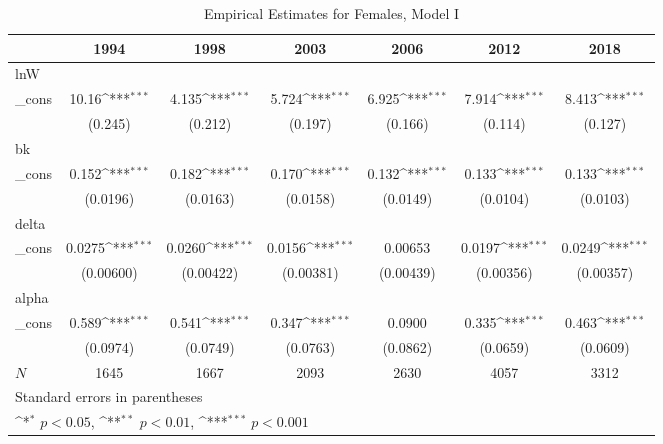 \begin{table}[htbp]\centering
\def\sym#1{\ifmmode^{#1}\else\(^{#1}\)\fi}
\caption{Empirical Estimates for Females, Model I}
\begin{tabular}{l*{6}{c}}
\hline\hline
            &\multicolumn{1}{c}{1994}&\multicolumn{1}{c}{1998}&\multicolumn{1}{c}{2003}&\multicolumn{1}{c}{2006}&\multicolumn{1}{c}{2012}&\multicolumn{1}{c}{2018}\\
\hline
lnW         &                     &                     &                     &                     &                     &                     \\
\_cons      &       10.16\sym{***}&       4.135\sym{***}&       5.724\sym{***}&       6.925\sym{***}&       7.914\sym{***}&       8.413\sym{***}\\
            &     (0.245)         &     (0.212)         &     (0.197)         &     (0.166)         &     (0.114)         &     (0.127)         \\
\hline
bk          &                     &                     &                     &                     &                     &                     \\
\_cons      &       0.152\sym{***}&       0.182\sym{***}&       0.170\sym{***}&       0.132\sym{***}&       0.133\sym{***}&       0.133\sym{***}\\
            &    (0.0196)         &    (0.0163)         &    (0.0158)         &    (0.0149)         &    (0.0104)         &    (0.0103)         \\
\hline
delta       &                     &                     &                     &                     &                     &                     \\
\_cons      &      0.0275\sym{***}&      0.0260\sym{***}&      0.0156\sym{***}&     0.00653         &      0.0197\sym{***}&      0.0249\sym{***}\\
            &   (0.00600)         &   (0.00422)         &   (0.00381)         &   (0.00439)         &   (0.00356)         &   (0.00357)         \\
\hline
alpha       &                     &                     &                     &                     &                     &                     \\
\_cons      &       0.589\sym{***}&       0.541\sym{***}&       0.347\sym{***}&      0.0900         &       0.335\sym{***}&       0.463\sym{***}\\
            &    (0.0974)         &    (0.0749)         &    (0.0763)         &    (0.0862)         &    (0.0659)         &    (0.0609)         \\
\hline
\(N\)       &        1645         &        1667         &        2093         &        2630         &        4057         &        3312         \\
\hline\hline
\multicolumn{7}{l}{\footnotesize Standard errors in parentheses}\\
\multicolumn{7}{l}{\footnotesize \sym{*} \(p<0.05\), \sym{**} \(p<0.01\), \sym{***} \(p<0.001\)}\\
\end{tabular}
\end{table}
